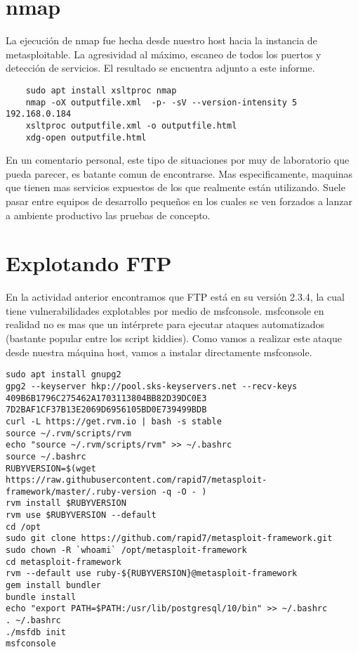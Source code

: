 \documentclass[11pt]{utalcaDoc}
\begin{document}
\section{nmap}

La ejecución de nmap fue hecha desde nuestro host hacia la instancia de metasploitable. La agresividad al máximo, escaneo de todos los puertos y detección de servicios. El resultado se encuentra adjunto a este informe.

\begin{verbatim}
	sudo apt install xsltproc nmap
	nmap -oX outputfile.xml  -p- -sV --version-intensity 5 192.168.0.184
	xsltproc outputfile.xml -o outputfile.html
	xdg-open outputfile.html
\end{verbatim}


En un comentario personal, este tipo de situaciones por muy de laboratorio que pueda parecer, es batante comun de encontrarse. Mas especificamente, maquinas que tienen mas servicios expuestos de los que realmente están utilizando. Suele pasar entre equipos de desarrollo pequeños en los cuales se ven forzados a lanzar a ambiente productivo las pruebas de concepto.

\section{Explotando FTP}
En la actividad anterior encontramos que FTP está en su versión 2.3.4, la cual tiene vulnerabilidades explotables por medio de msfconsole. msfconsole en realidad no es mas que un intérprete para ejecutar ataques automatizados (bastante popular entre los script kiddies). Como vamos a realizar este ataque desde nuestra máquina host, vamos a instalar directamente msfconsole.

\begin{verbatim}
sudo apt install gnupg2
gpg2 --keyserver hkp://pool.sks-keyservers.net --recv-keys 409B6B1796C275462A1703113804BB82D39DC0E3 7D2BAF1CF37B13E2069D6956105BD0E739499BDB
curl -L https://get.rvm.io | bash -s stable
source ~/.rvm/scripts/rvm
echo "source ~/.rvm/scripts/rvm" >> ~/.bashrc
source ~/.bashrc
RUBYVERSION=$(wget https://raw.githubusercontent.com/rapid7/metasploit-framework/master/.ruby-version -q -O - )
rvm install $RUBYVERSION
rvm use $RUBYVERSION --default
cd /opt
sudo git clone https://github.com/rapid7/metasploit-framework.git
sudo chown -R `whoami` /opt/metasploit-framework
cd metasploit-framework
rvm --default use ruby-${RUBYVERSION}@metasploit-framework
gem install bundler
bundle install
echo "export PATH=$PATH:/usr/lib/postgresql/10/bin" >> ~/.bashrc
. ~/.bashrc 
./msfdb init
msfconsole
\end{verbatim}
\end{document}
